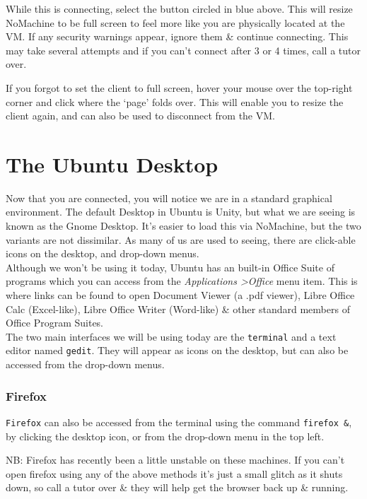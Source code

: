 \begin{warning}
While this is connecting, select the button circled in blue above.
This will resize NoMachine to be full screen to feel more like you are physically located at the VM.
If any security warnings appear, ignore them \& continue connecting.
This may take several attempts and if you can't connect after 3 or 4 times, call a tutor over.
\end{warning}

If you forgot to set the client to full screen, hover your mouse over the top-right corner and click where the `page' folds over. 
This will enable you to resize the client again, and can also be used to disconnect from the VM.\\


\section{The Ubuntu Desktop}
\begin{note}
Now that you are connected, you will notice we are in a standard graphical environment.
The default Desktop in Ubuntu is Unity, but what we are seeing is known as the Gnome Desktop.
It's easier to load this via NoMachine, but the two variants are not dissimilar.
As many of us are used to seeing, there are click-able icons on the desktop, and drop-down menus. \\

Although we won't be using it today, Ubuntu has an built-in Office Suite of
programs which you can access from the \textit{Applications \textgreater Office} menu item.
This is where links can be found to open Document Viewer (a .pdf viewer), Libre Office Calc (Excel-like), Libre Office Writer (Word-like) \& other standard members of Office Program Suites. \\

The two main interfaces we will be using today are the \texttt{terminal} and a text editor named \texttt{gedit}.
They will appear as icons on the desktop, but can also be accessed from the drop-down menus.
\end{note}

\subsubsection*{Firefox}

\texttt{Firefox} can also be accessed from the terminal using the command \texttt{firefox \&},  by clicking the desktop icon, or from the drop-down menu in the top left.
\begin{warning}
NB: Firefox has recently been a little unstable on these machines.
If you can't open firefox using any of the above methods it's just a small glitch as it shuts down, so call a tutor over \& they will help get the browser back up \& running.
\end{warning}
